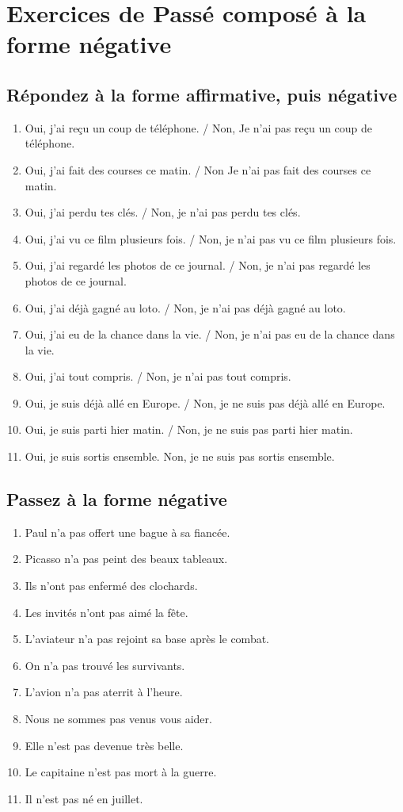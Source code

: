 \section{Exercices de Passé composé à la forme négative}

\subsection{Répondez à la forme affirmative, puis négative}
\begin{enumerate}
    \item Oui, j'ai reçu un coup de téléphone. / Non, Je n'ai pas reçu un coup de téléphone.
    \item Oui, j'ai fait des courses ce matin. / Non Je n'ai pas fait des courses ce matin.
    \item Oui, j'ai perdu tes clés. / Non, je n'ai pas perdu tes clés.
    \item Oui, j'ai vu ce film plusieurs fois. / Non, je n'ai pas vu ce film plusieurs fois.
    \item Oui, j'ai regardé les photos de ce journal. / Non, je n'ai pas regardé les photos de ce journal.
    \item Oui, j'ai déjà gagné au loto. / Non, je n'ai pas déjà gagné au loto.
    \item Oui, j'ai eu de la chance dans la vie. / Non, je n'ai pas eu de la chance dans la vie.
    \item Oui, j'ai tout compris. / Non, je n'ai pas tout compris.
    \item Oui, je suis déjà allé en Europe. / Non, je ne suis pas déjà allé en Europe.
    \item Oui, je suis parti hier matin. / Non, je ne suis pas parti hier matin.
    \item Oui, je suis sortis ensemble. Non, je ne suis pas sortis ensemble.
\end{enumerate}

\subsection{Passez à la forme négative}
\begin{enumerate}
    \item Paul n'a pas offert une bague à sa fiancée.
    \item Picasso n'a pas peint des beaux tableaux.
    \item Ils n'ont pas enfermé des clochards.
    \item Les invités n'ont pas aimé la fête.
    \item L'aviateur n'a pas rejoint sa base après le combat.
    \item On n'a pas trouvé les survivants.
    \item L'avion n'a pas aterrit à l'heure.
    \item Nous ne sommes pas venus vous aider.
    \item Elle n'est pas devenue très belle.
    \item Le capitaine n'est pas mort à la guerre.
    \item Il n'est pas né en juillet.
\end{enumerate}